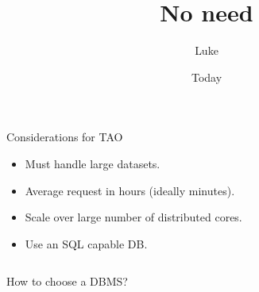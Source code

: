 \documentclass[aspectratio=169]{beamer}
\title[Whats this]{No need}
\author{Luke}
\institute{Somewhere}
\date{Today}
\begin{document}
\begin{frame}[plain]{}
  \begin{exampleblock}{}
    {\LARGE Considerations for TAO}
  \end{exampleblock}
  \Large
  \begin{itemize}
    \item Must handle large datasets.
    \item Average request in hours (ideally minutes).
    \item Scale over large number of distributed cores.
    \item Use an SQL capable DB.
  \end{itemize}
  \begin{columns}[c]
    \column{3cm}
    \column{4cm}
    \begin{exampleblock}{}
      How to choose a DBMS?
    \end{exampleblock}
  \end{columns}
\end{frame}








\end{document}
